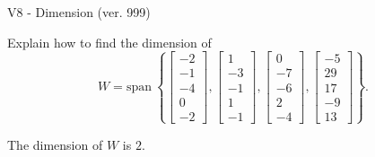 \begin{exercise}
  \begin{exerciseTitle}V8 - Dimension (ver. 999)\end{exerciseTitle}
  \begin{exerciseStatement}
    Explain how to find the dimension of 
\[W=\mathrm{span}\ \left\{\left[\begin{array}{r}
-2 \\
-1 \\
-4 \\
0 \\
-2
\end{array}\right] , \left[\begin{array}{r}
1 \\
-3 \\
-1 \\
1 \\
-1
\end{array}\right] , \left[\begin{array}{r}
0 \\
-7 \\
-6 \\
2 \\
-4
\end{array}\right] , \left[\begin{array}{r}
-5 \\
29 \\
17 \\
-9 \\
13
\end{array}\right]\right\}.\]



  \end{exerciseStatement}
  \begin{exerciseAnswer}
   The dimension of \(W\) is  \(2\).
  


  \end{exerciseAnswer}
\end{exercise}